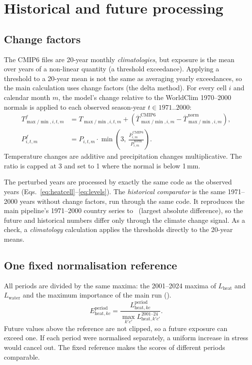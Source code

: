 \section{Historical and future processing}\label{sec:periods}

\subsection{Change factors}\label{sec:changefactors}
The CMIP6 files are 20-year monthly \emph{climatologies}, but exposure is the mean over years of a non-linear
quantity (a threshold exceedance). Applying a threshold to a 20-year mean is not the same as averaging yearly
exceedances, so the main calculation uses change factors (the delta method). For every cell $i$ and calendar
month $m$, the model's change relative to the WorldClim 1970--2000 normals is applied to each observed season-year
$t\in1971..2000$:
\begin{align}
T^{f}_{\max/\min,i,t,m} &= T_{\max/\min,i,t,m} + \left(\overline T^{\,\text{CMIP6}}_{\max/\min,i,m}-\overline T^{\,\text{norm}}_{\max/\min,i,m}\right), \label{eq:delta}\\
P^{f}_{i,t,m} &= P_{i,t,m}\cdot\min\!\left(3,\ \frac{\overline P^{\,\text{CMIP6}}_{i,m}}{\overline P^{\,\text{norm}}_{i,m}}\right). \label{eq:deltap}
\end{align}
Temperature changes are additive and precipitation changes multiplicative. The ratio is capped at 3 and set to 1
where the normal is below 1\,mm.

The perturbed years are processed by exactly the same code as the observed years
(Eqs.~\ref{eq:heatcell}--\ref{eq:levels}). The \emph{historical comparator} is the same 1971--2000 years without
change factors, run through the same code. It reproduces the main pipeline's 1971--2000 country series to
\histReproMaxDiff\ (largest absolute difference), so the future and historical numbers differ only through the
climate change signal. As a check, a \emph{climatology} calculation applies the thresholds directly to the 20-year
means.

\subsection{One fixed normalisation reference}\label{sec:fixedref}
All periods are divided by the same maxima: the 2001--2024 maxima of $L_{\text{heat}}$ and $L_{\text{water}}$ and
the maximum importance of the main run ().
\begin{equation}\label{eq:fixedref}
E^{\text{period}}_{\text{heat},kc} = \frac{L^{\text{period}}_{\text{heat},kc}}{\max_{k'c'} L^{2001\text{--}24}_{\text{heat},k'c'}} .
\end{equation}
Future values above the reference are not clipped, so a future exposure can exceed one. If each period were
normalised separately, a uniform increase in stress would cancel out. The fixed reference makes the scores of
different periods comparable.

